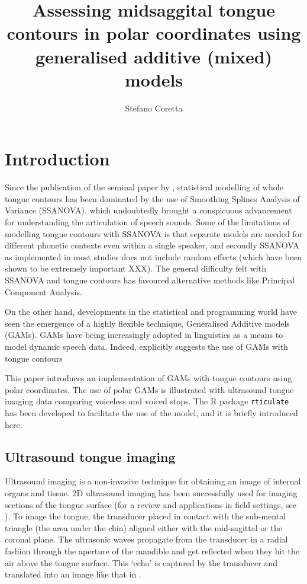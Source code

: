 \documentclass[12pt,]{article}
\title{Assessing midsaggital tongue contours in polar coordinates using
generalised additive (mixed) models}
\author{Stefano Coretta}
\date{}
\begin{document}
\maketitle

\hypertarget{introduction}{%
\section{Introduction}\label{introduction}}

Since the publication of the seminal paper by \citet{davidson2006},
statistical modelling of whole tongue contours has been dominated by the
use of Smoothing Splines Analysis of Variance (SSANOVA), which
undoubtedly brought a conspicuous advancement for understanding the
articulation of speech sounds. Some of the limitations of modelling
tongue contours with SSANOVA is that separate models are needed for
different phonetic contexts even within a single speaker, and secondly
SSANOVA as implemented in most studies does not include random effects
(which have been shown to be extremely important XXX). The general
difficulty felt with SSANOVA and tongue contours has favoured
alternative methods like Principal Component Analysis.

On the other hand, developments in the statistical and programming world
have seen the emergence of a highly flexible technique, Generalised
Additive models (GAMs). GAMs have being increasingly adopted in
linguistics as a means to model dynamic speech data. Indeed,
\citet{soskuthy2017} explicitly suggests the use of GAMs with tongue
contours

This paper introduces an implementation of GAMs with tongue contours
using polar coordinates. The use of polar GAMs is illustrated with
ultrasound tongue imaging data comparing voiceless and voiced stops. The
R package \texttt{rticulate} has been developed to facilitate the use of
the model, and it is briefly introduced here.

\hypertarget{ultrasound-tongue-imaging}{%
\subsection{Ultrasound tongue imaging}\label{ultrasound-tongue-imaging}}

Ultrasound imaging is a non-invasive technique for obtaining an image of
internal organs and tissue. 2D ultrasound imaging has been successfully
used for imaging sections of the tongue surface (for a review and
applications in field settings, see \citealt{gick2002}). To image the
tongue, the transducer placed in contact with the sub-mental triangle
(the area under the chin) aligned either with the mid-sagittal or the
coronal plane. The ultrasonic waves propagate from the transducer in a
radial fashion through the aperture of the mandible and get reflected
when they hit the air above the tongue surface. This `echo' is captured
by the transducer and translated into an image like that in
.
\end{document}
